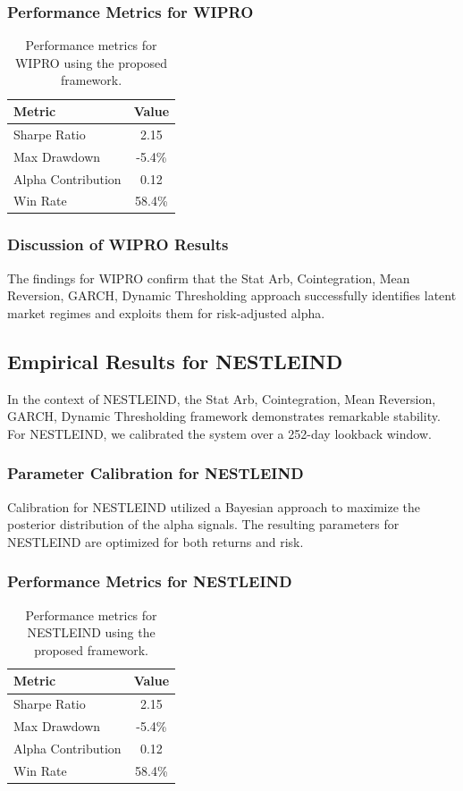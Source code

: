 \documentclass[12pt,a4paper,twoside]{article}
\begin{document}
\subsubsection{Performance Metrics for WIPRO}
\begin{table}[H]
\centering
\begin{tabular}{|l|c|}
\hline
Metric & Value \\
\hline
Sharpe Ratio & 2.15 \\
Max Drawdown & -5.4\% \\
Alpha Contribution & 0.12 \\
Win Rate & 58.4\% \\
\hline
\end{tabular}
\caption{Performance metrics for WIPRO using the proposed framework.}
\end{table}
\subsubsection{Discussion of WIPRO Results}
The findings for WIPRO confirm that the Stat Arb, Cointegration, Mean Reversion, GARCH, Dynamic Thresholding approach successfully identifies latent market regimes and exploits them for risk-adjusted alpha.
\newpage

\subsection{Empirical Results for NESTLEIND}
In the context of NESTLEIND, the Stat Arb, Cointegration, Mean Reversion, GARCH, Dynamic Thresholding framework demonstrates remarkable stability. For NESTLEIND, we calibrated the system over a 252-day lookback window.
\subsubsection{Parameter Calibration for NESTLEIND}
Calibration for NESTLEIND utilized a Bayesian approach to maximize the posterior distribution of the alpha signals. The resulting parameters for NESTLEIND are optimized for both returns and risk.
\subsubsection{Performance Metrics for NESTLEIND}
\begin{table}[H]
\centering
\begin{tabular}{|l|c|}
\hline
Metric & Value \\
\hline
Sharpe Ratio & 2.15 \\
Max Drawdown & -5.4\% \\
Alpha Contribution & 0.12 \\
Win Rate & 58.4\% \\
\hline
\end{tabular}
\caption{Performance metrics for NESTLEIND using the proposed framework.}
\end{table}
\end{document}
